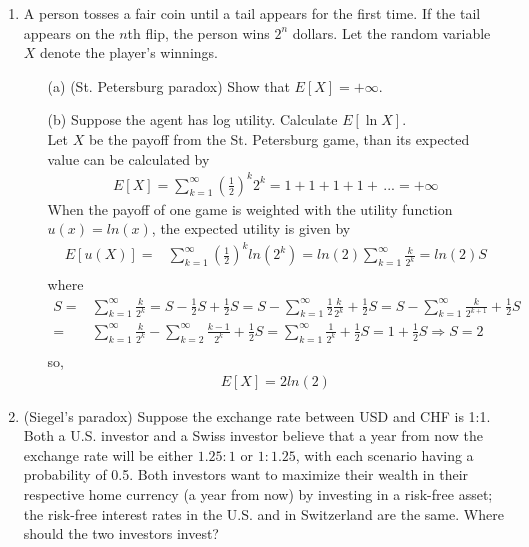 \documentclass[letterpaper,12pt]{article}
\theoremstyle{definition}
\begin{document}
\begin{enumerate}
   	\item A person tosses a fair coin until a tail appears for the first time. If the tail appears on the $n$th flip, the person wins $2^n$ dollars. Let the random variable $X$ denote the player's winnings.
		\begin{itemize}
			\item[(a)] (St. Petersburg paradox) Show that $E[X]= + \infty$.
			\item[(b)] Suppose the agent has log utility. Calculate $E[\ln X]$.\\
			

Let $X$ be the payoff from the St. Petersburg game, than its expected value can be calculated by
\begin{align*}
E[X] = \sum_{k=1}^\infty \left(\frac{1}{2} \right)^k 2^{k} =1+ 1+ 1+ 1+ \,... = +\infty
\end{align*}
When the payoff of one game is weighted with the utility function $u(x)=ln(x)$, the expected utility is given by
\begin{align*}
E[u(X)] =& \sum_{k=1}^\infty \left(\frac{1}{2}\right)^k  ln(2^{k}) =  ln(2) \sum_{k=1}^\infty \frac{k}{2^k} = ln(2) S \\ 
\end{align*} where
\begin{align*}
S=& \sum_{k=1}^\infty \frac{k}{2^k} = S -\frac{1}{2}S+ \frac{1}{2}S = S-\sum_{k=1}^\infty \frac{1}{2}\frac{k}{2^k}+ \frac{1}{2}S = S-\sum_{k=1}^\infty \frac{k}{2^{k+1}}+ \frac{1}{2}S \\
=&  \sum_{k=1}^\infty \frac{k}{2^k}- \sum_{k=2}^\infty \frac{k-1}{2^{k}}+ \frac{1}{2}S = \sum^{\infty}_{k=1} \frac{1}{2^k} + \frac{1}{2}S = 1 + \frac{1}{2}S \Rightarrow S=2\\
\end{align*}
so,
\begin{align*}
E[X] = 2ln(2)
\end{align*}
		\end{itemize}
	\item (Siegel's paradox) Suppose the exchange rate between USD and CHF is 1:1. Both a U.S. investor and a Swiss investor believe that a year from now the exchange rate will be either $1.25:1$ or $1:1.25$, with each scenario having a probability of 0.5. Both investors want to maximize their wealth in their respective home currency (a year from now) by investing in a risk-free asset; the risk-free interest rates in the U.S. and in Switzerland are the same. Where should the two investors invest?\\


\end{enumerate}
\end{document}
